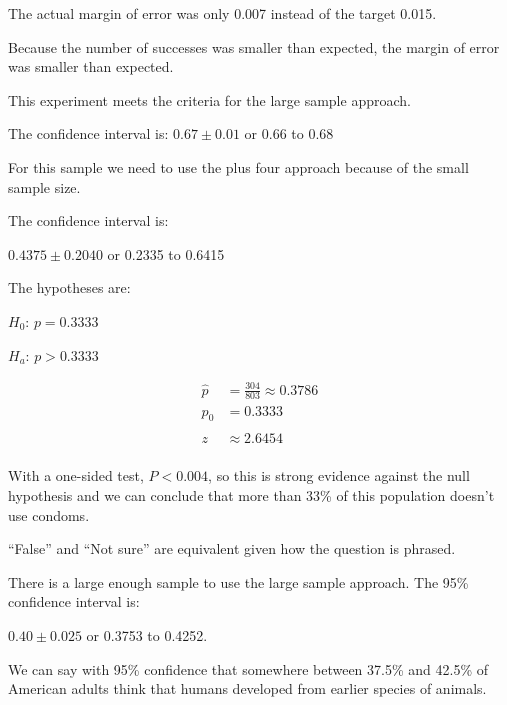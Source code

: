 \documentclass[letterpaper]{exam}
\begin{document}
\begin{description}
\begin{enumerate}[(a)]
            The actual margin of error was only 0.007 instead of the target 0.015.

            Because the number of successes was smaller than expected, the margin of
            error was smaller than expected.
        \end{enumerate}

      \item[36] This experiment meets the criteria for the large sample approach.
        
        The confidence interval is: $0.67 \pm 0.01$ or 0.66 to 0.68

      \item[37]
        For this sample we need to use the plus four approach because of the small
        sample size.

        The confidence interval is: 

        $0.4375 \pm 0.2040$ or 0.2335 to 0.6415

      \item[38]
        The hypotheses are:
        \begin{itemize*}
          \item $H_0$: $p = 0.3333$
          \item $H_a$: $p > 0.3333$
        \end{itemize*}

        \begin{align*}
          \hat{p} & = \frac{304}{803} \approx 0.3786 \\
          p_0     & = 0.3333 \\
          \\
          z       & \approx 2.6454 \\
        \end{align*}

        With a one-sided test, $P < 0.004$, so this is strong evidence against the
        null hypothesis and we can conclude that more than 33\% of this population
        doesn't use condoms.

      \item[39]
       ``False'' and ``Not sure'' are equivalent given how the question is phrased.

       There is a large enough sample to use the large sample approach. The 95\%
       confidence interval is:

       $0.40 \pm 0.025$ or 0.3753 to 0.4252.

       We can say with 95\% confidence that somewhere between 37.5\% and 42.5\% of
       American adults think that humans developed from earlier species of animals.


\end{description}
\end{document}

